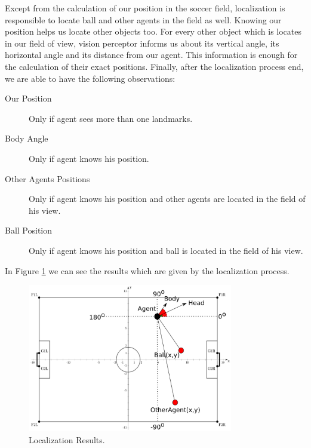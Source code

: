 Except from the calculation of our position in the soccer field, localization is responsible to locate ball and other agents in the field as well. Knowing our position helps us locate other objects too. For every other object which is locates in our field of view, vision perceptor informs us about its vertical angle, its horizontal angle and its distance from our agent. This information is enough for the calculation of their exact positions. Finally, after the localization process end, we are able to have the following observations:\\

\begin{description}
	\item[Our Position] Only if agent sees more than one landmarks.
	\item[Body Angle] Only if agent knows his position.
	\item[Other Agents Positions]	Only if agent knows his position and other agents are located in the field of his view.
	\item[Ball Position] Only if agent knows his position and ball is located in the field of his view.
\end{description}
In Figure \ref{fig:LocalizationResults} we can see the results which are given by the localization process.
\begin{figure}[htb!]
\centering
  \includegraphics[width=0.8\textwidth]{Chapter3/figures/LocalizationResults.pdf}
  \caption{Localization Results.} 
  \label{fig:LocalizationResults}
\end{figure}
\hfill









